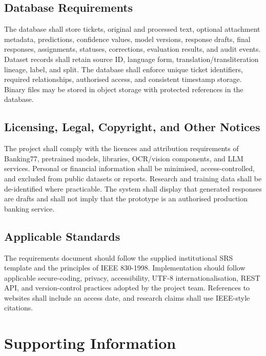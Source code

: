 \documentclass[10pt,letterpaper]{article}
\newenvironment{templatebody}{\par\justifying\setlength{\emergencystretch}{3em}}{\par}
\begin{document}
\begin{templatebody}
\subsection{Database Requirements}
The database shall store tickets, original and processed text, optional attachment metadata, predictions, confidence values, model versions, response drafts, final responses, assignments, statuses, corrections, evaluation results, and audit events. Dataset records shall retain source ID, language form, translation/transliteration lineage, label, and split. The database shall enforce unique ticket identifiers, required relationships, authorised access, and consistent timestamp storage. Binary files may be stored in object storage with protected references in the database.

\subsection{Licensing, Legal, Copyright, and Other Notices}
The project shall comply with the licences and attribution requirements of Banking77, pretrained models, libraries, OCR/vision components, and LLM services. Personal or financial information shall be minimised, access-controlled, and excluded from public datasets or reports. Research and training data shall be de-identified where practicable. The system shall display that generated responses are drafts and shall not imply that the prototype is an authorised production banking service.

\subsection{Applicable Standards}
The requirements document should follow the supplied institutional SRS template and the principles of IEEE 830-1998. Implementation should follow applicable secure-coding, privacy, accessibility, UTF-8 internationalisation, REST API, and version-control practices adopted by the project team. References to websites shall include an access date, and research claims shall use IEEE-style citations.

\section{Supporting Information}


\end{templatebody}
\end{document}
